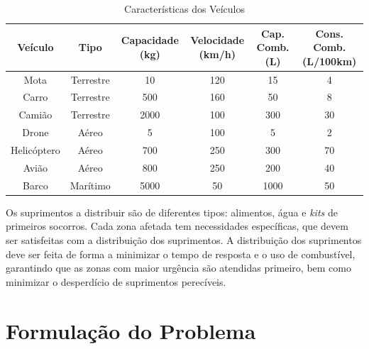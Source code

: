 \documentclass[a4paper,12pt]{scrreprt}
\begin{document}
\begin{table}[ht]
    \centering
    \small %
    \setlength{\tabcolsep}{0.5pt} %
    \renewcommand{\arraystretch}{1.2} %
    \fontsize{9}{10}\selectfont
    \begin{tabular}{|c|c|c|c|c|c|}
        \hline
        \textbf{Veículo} & \textbf{Tipo} & \textbf{Capacidade (kg)} & \textbf{Velocidade (km/h)} & \textbf{Cap. Comb. (L)} & \textbf{Cons. Comb. (L/100km)} \\
        \hline
        Mota & Terrestre & 10 & 120 & 15 & 4 \\
        Carro & Terrestre & 500 & 160 & 50 & 8 \\
        Camião & Terrestre & 2000 & 100 & 300 & 30 \\
        \hline
        Drone & Aéreo & 5 & 100 & 5 & 2 \\
        Helicóptero & Aéreo & 700 & 250 & 300 & 70 \\
        Avião & Aéreo & 800 & 250 & 200 & 40 \\
        \hline
        Barco & Marítimo & 5000 & 50 & 1000 & 50 \\
        \hline
    \end{tabular}
    \caption{Características dos Veículos}
    \label{tab:veiculos}
\end{table}

Os suprimentos a distribuir são de diferentes tipos: alimentos, água e \textit{kits} de primeiros socorros. Cada zona afetada
tem necessidades específicas, que devem ser satisfeitas com a distribuição dos suprimentos. A distribuição dos suprimentos
deve ser feita de forma a minimizar o tempo de resposta e o uso de combustível, garantindo que as zonas com maior urgência
são atendidas primeiro, bem como minimizar o desperdício de suprimentos perecíveis.



\chapter{Formulação do Problema}
\end{document}
